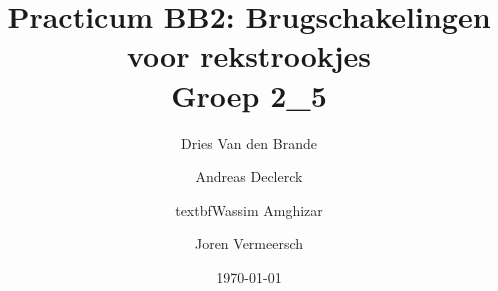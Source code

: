 \documentclass[12pt]{article}
\begin{document}
    \title{\textbf{Practicum BB2: Brugschakelingen voor rekstrookjes} \\\small{Groep 2\_5}}
    \author{Dries Van den Brande \and Andreas Declerck \and textbf{Wassim Amghizar} \and Joren Vermeersch}
    \date{\today}

    \maketitle


    

    

    

    

    

    

    

    

    
\end{document}
